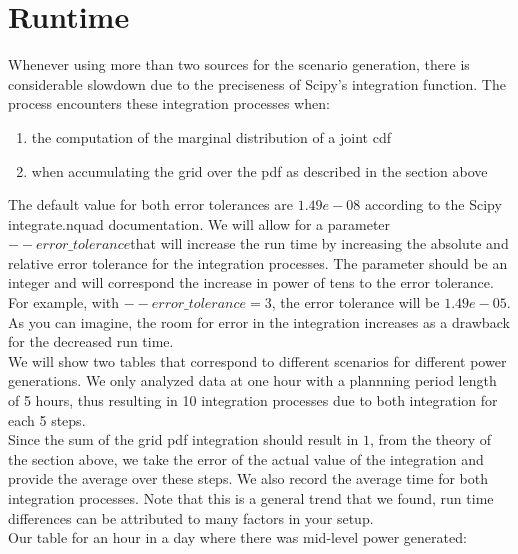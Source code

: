 \section{Runtime}

Whenever using more than two sources for the scenario generation, there is considerable slowdown due to the preciseness of Scipy's integration function. The process encounters these integration processes when:
\begin{enumerate}
	\item the computation of the marginal distribution of a joint cdf
	\item when accumulating the grid over the pdf as described in the section above
\end{enumerate}

The default value for both error tolerances are $1.49e-08$ according to the Scipy integrate.nquad documentation. We will allow for a parameter $ --error\_tolerance $that will increase the run time by increasing the absolute and relative error tolerance for the integration processes. The parameter should be  an integer and will correspond the increase in power of tens to the error tolerance. For example, with $--error\_tolerance=3$, the error tolerance will be $1.49e-05$. As you can imagine, the room for error in the integration increases as a drawback for the decreased run time.\\

We will show two tables that correspond to different scenarios for different power generations. We only analyzed data at one hour with a plannning period length of 5 hours, thus resulting in 10 integration  processes due to both integration for each 5 steps. \\

 Since the sum of the grid pdf integration should result in $1$, from the theory of the section above, we take the error of the actual value of the integration and provide the average over these steps. We also record the average time for both integration processes. Note that this is a general trend that we found, run time differences can be attributed to many factors in your setup. \\

Our table for an hour in  a day where there was mid-level power generated: \\

